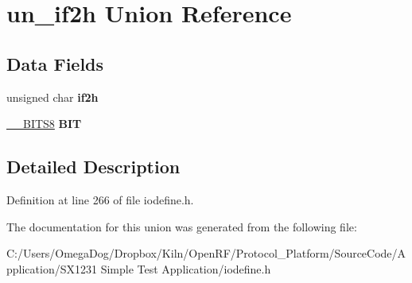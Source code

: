 \hypertarget{unionun__if2h}{\section{un\-\_\-if2h Union Reference}
\label{unionun__if2h}
}
\subsection*{Data Fields}
\begin{DoxyCompactItemize}
\item 
\hypertarget{unionun__if2h_a7aa5c803e629bc068b0fa9d4645a8eb7}{unsigned char {\bfseries if2h}}\label{unionun__if2h_a7aa5c803e629bc068b0fa9d4645a8eb7}

\item 
\hypertarget{unionun__if2h_a26690454cd2537c32f35c4e9fabde24c}{\hyperlink{struct_____b_i_t_s8}{\-\_\-\-\_\-\-B\-I\-T\-S8} {\bfseries B\-I\-T}}\label{unionun__if2h_a26690454cd2537c32f35c4e9fabde24c}

\end{DoxyCompactItemize}


\subsection{Detailed Description}


Definition at line 266 of file iodefine.\-h.



The documentation for this union was generated from the following file\-:\begin{DoxyCompactItemize}
\item 
C\-:/\-Users/\-Omega\-Dog/\-Dropbox/\-Kiln/\-Open\-R\-F/\-Protocol\-\_\-\-Platform/\-Source\-Code/\-Application/\-S\-X1231 Simple Test Application/iodefine.\-h\end{DoxyCompactItemize}
